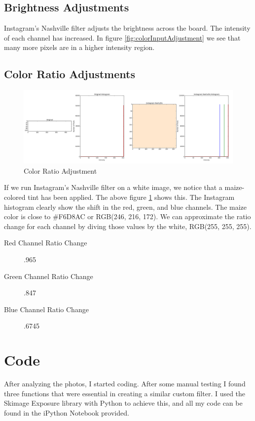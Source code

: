 \documentclass{article}
\begin{document}
\subsection{Brightness Adjustments}
Instagram's Nashville filter adjusts the brightness across the board. The intensity of each channel has increased.  In figure \ref{fig:colorInputAdjustment} we see that many more pixels are in a higher intensity region.

\pagebreak
\subsection{Color Ratio Adjustments}

\begin{figure}[H]
\includegraphics[width=\linewidth]{color_ratio_adjustment.png}
\caption{Color Ratio Adjustment}
\label{fig:colorRatioAdjustment}
\end{figure}
If we run Instagram's Nashville filter on a white image, we notice that a maize-colored tint has been applied. The above figure \ref{fig:colorRatioAdjustment} shows this. The Instagram histogram clearly show the shift in the red, green, and blue channels. The maize color is close to \#F6D8AC or RGB(246, 216, 172). We can approximate the ratio change for each channel by diving those values by the white, RGB(255, 255, 255).
\begin{description}
\item[Red Channel Ratio Change] .965
\item[Green Channel Ratio Change] .847
\item[Blue Channel Ratio Change] .6745
\end{description}

\pagebreak

\section{Code}

After analyzing the photos, I started coding. After some manual testing I found three functions that were essential in creating a similar custom filter. I used the Skimage Exposure library with Python to achieve this, and all my code can be found in the iPython Notebook provided.
\end{document}
